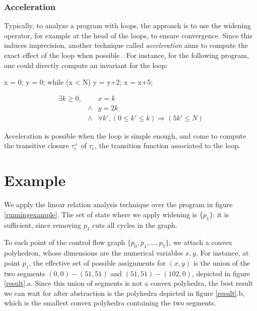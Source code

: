 \documentclass[a4paper,english,titlepage,11pt]{article}
\begin{document}
\subsubsection{Acceleration}

Typically, to analyze a program with loops, the approach is to use the
widening operator, for example at the head of the loops, to ensure convergence.
Since this induces imprecision, another technique called \emph{acceleration}
aims to compute the exact effect of the loop when possible \cite{Gon07,GH06}. For instance, for
the following program, one could directly compute an invariant for the loop:


\begin{minipage}[c]{.39\linewidth}
\begin{C}
x = 0;
y = 0;
while (x < N) {
	y = y+2;
	x = x+5;
}
\end{C}
\end{minipage} 
\begin{minipage}[c]{.59\linewidth}
$$\begin{array}{llll}
\exists k \geq 0,& & x  = k \\
		&\wedge & y = 2k \\
		&\wedge & \forall k', (0 \leq k' \leq k)
				\Rightarrow (5k' \leq N)
\end{array}$$
\end{minipage}

Acceleration is possible when the loop is simple enough, and come to compute the
transitive closure $\tau_e^+$ of $\tau_e$, the transition function associated to
the loop.

\section{Example}

We apply the linear relation analysis technique over the program in figure
\ref{runningexample}. The set of state where we apply widening is $\{p_1\}$: it
is sufficient, since removing $p_1$ cuts all cycles in the graph.

To each point of the control flow graph $\{p_0, p_1,\dots, p_7\}$, we attach a
convex polyhedron, whose dimensions are the numerical variables $x,y$.
For instance, at point $p_1$, the effective set of possible assignments for
$(x,y)$ is the union of the two segments $(0,0) - (51,51)$ and $(51,51) -
(102,0)$, depicted in figure \ref{result}.a. Since this union of segments is not
a convex polyhedra, the best result we can wait for after abstraction is the
polyhedra depicted in figure \ref{result}.b, which is the smallest convex
polyhedra containing the two segments.
\end{document}

